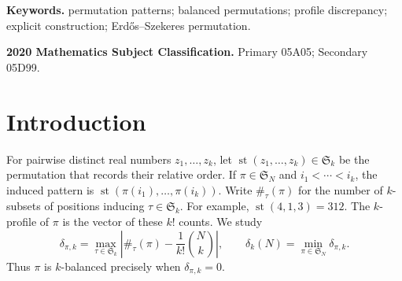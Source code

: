 \documentclass[11pt,letterpaper]{article}
\newcommand{\Ssym}{\mathfrak S}
\begin{document}
\noindent\textbf{Keywords.} permutation patterns; balanced permutations;
profile discrepancy; explicit construction; Erd\H{o}s--Szekeres permutation.

\noindent\textbf{2020 Mathematics Subject Classification.}
Primary 05A05; Secondary 05D99.

\section{Introduction}

For pairwise distinct real numbers $z_1,\ldots,z_k$, let
$\operatorname{st}(z_1,\ldots,z_k)\in\Ssym_k$ be the permutation that
records their relative order.  If $\pi\in\Ssym_N$ and
$i_1<\cdots<i_k$, the induced pattern is
$\operatorname{st}(\pi(i_1),\ldots,\pi(i_k))$.  Write $\#_\tau(\pi)$
for the number of $k$-subsets of positions inducing $\tau\in\Ssym_k$.
For example, $\operatorname{st}(4,1,3)=312$.
The $k$-profile of $\pi$ is the vector of these $k!$ counts.  We study
\[
 \delta_{\pi,k}=
 \max_{\tau\in\Ssym_k}\left|\#_\tau(\pi)-\frac1{k!}\binom Nk\right|,
 \qquad
 \delta_k(N)=\min_{\pi\in\Ssym_N}\delta_{\pi,k}.
\]
Thus $\pi$ is $k$-balanced precisely when $\delta_{\pi,k}=0$.
\end{document}
